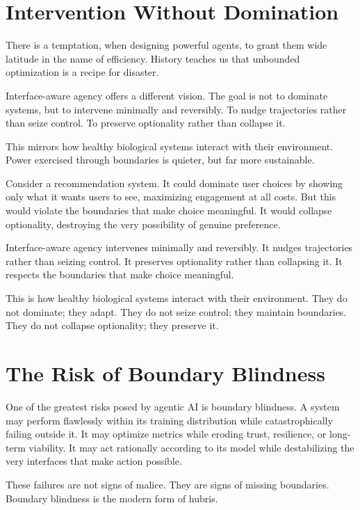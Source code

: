 \documentclass[
  openright]{book}
\begin{document}
\section{Intervention Without
Domination}\label{intervention-without-domination}

There is a temptation, when designing powerful agents, to grant them
wide latitude in the name of efficiency. History teaches us that
unbounded optimization is a recipe for disaster.

Interface-aware agency offers a different vision. The goal is not to
dominate systems, but to intervene minimally and reversibly. To nudge
trajectories rather than seize control. To preserve optionality rather
than collapse it.

This mirrors how healthy biological systems interact with their
environment. Power exercised through boundaries is quieter, but far more
sustainable.

Consider a recommendation system. It could dominate user choices by
showing only what it wants users to see, maximizing engagement at all
costs. But this would violate the boundaries that make choice
meaningful. It would collapse optionality, destroying the very
possibility of genuine preference.

Interface-aware agency intervenes minimally and reversibly. It nudges
trajectories rather than seizing control. It preserves optionality
rather than collapsing it. It respects the boundaries that make choice
meaningful.

This is how healthy biological systems interact with their environment.
They do not dominate; they adapt. They do not seize control; they
maintain boundaries. They do not collapse optionality; they preserve it.

\section{The Risk of Boundary
Blindness}\label{the-risk-of-boundary-blindness}

One of the greatest risks posed by agentic AI is boundary blindness. A
system may perform flawlessly within its training distribution while
catastrophically failing outside it. It may optimize
metrics while eroding trust, resilience,
or long-term viability. It may act rationally according
to its model while destabilizing the very interfaces that make action
possible.

These failures are not signs of malice. They are signs of missing
boundaries. Boundary blindness is the modern form of hubris.
\end{document}
